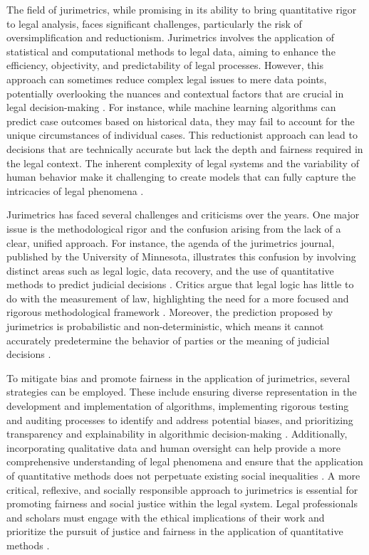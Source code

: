 The field of jurimetrics, while promising in its ability to bring quantitative rigor to legal analysis, faces significant challenges, particularly the risk of oversimplification and reductionism. Jurimetrics involves the application of statistical and computational methods to legal data, aiming to enhance the efficiency, objectivity, and predictability of legal processes. However, this approach can sometimes reduce complex legal issues to mere data points, potentially overlooking the nuances and contextual factors that are crucial in legal decision-making \cite{unger2021process}. For instance, while machine learning algorithms can predict case outcomes based on historical data, they may fail to account for the unique circumstances of individual cases. This reductionist approach can lead to decisions that are technically accurate but lack the depth and fairness required in the legal context. The inherent complexity of legal systems and the variability of human behavior make it challenging to create models that can fully capture the intricacies of legal phenomena \cite{unger2021process}.

Jurimetrics has faced several challenges and criticisms over the years. One major issue is the methodological rigor and the confusion arising from the lack of a clear, unified approach. For instance, the agenda of the jurimetrics journal, published by the University of Minnesota, illustrates this confusion by involving distinct areas such as legal logic, data recovery, and the use of quantitative methods to predict judicial decisions \cite{nunes2016jurimetria}. Critics argue that legal logic has little to do with the measurement of law, highlighting the need for a more focused and rigorous methodological framework \cite{nunes2016jurimetria}. Moreover, the prediction proposed by jurimetrics is probabilistic and non-deterministic, which means it cannot accurately predetermine the behavior of parties or the meaning of judicial decisions \cite{nunes2016jurimetria}.

To mitigate bias and promote fairness in the application of jurimetrics, several strategies can be employed. These include ensuring diverse representation in the development and implementation of algorithms, implementing rigorous testing and auditing processes to identify and address potential biases, and prioritizing transparency and explainability in algorithmic decision-making \cite{10.1007/s11186-021-09453-1,10.3390/fi9040068}. Additionally, incorporating qualitative data and human oversight can help provide a more comprehensive understanding of legal phenomena and ensure that the application of quantitative methods does not perpetuate existing social inequalities \cite{10.1007/s11186-021-09453-1,10.3390/fi9040068}. A more critical, reflexive, and socially responsible approach to jurimetrics is essential for promoting fairness and social justice within the legal system. Legal professionals and scholars must engage with the ethical implications of their work and prioritize the pursuit of justice and fairness in the application of quantitative methods \cite{10.1007/s11186-021-09453-1,10.3390/fi9040068}.

